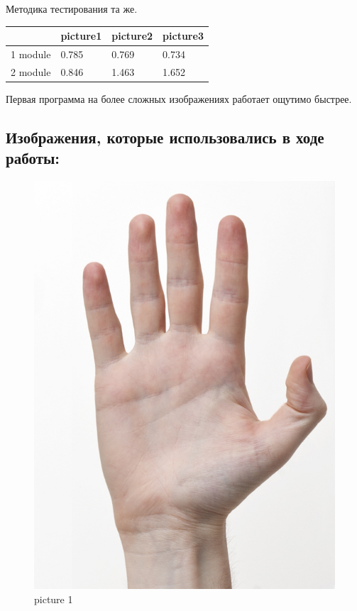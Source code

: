 \documentclass[
  12pt,
  a4paper,
]{article}
\begin{document}
Методика тестирования та же.

\begin{longtable}[]{@{}llll@{}}
\toprule
& picture1 & picture2 & picture3\tabularnewline
\midrule
\endhead
1 module & 0.785 & 0.769 & 0.734\tabularnewline
2 module & 0.846 & 1.463 & 1.652\tabularnewline
\bottomrule
\end{longtable}

Первая программа на более сложных изображениях работает ощутимо быстрее.

\hypertarget{ux438ux437ux43eux431ux440ux430ux436ux435ux43dux438ux44f-ux43aux43eux442ux43eux440ux44bux435-ux438ux441ux43fux43eux43bux44cux437ux43eux432ux430ux43bux438ux441ux44c-ux432-ux445ux43eux434ux435-ux440ux430ux431ux43eux442ux44b}{%
\subsection{Изображения, которые использовались в ходе
работы:}\label{ux438ux437ux43eux431ux440ux430ux436ux435ux43dux438ux44f-ux43aux43eux442ux43eux440ux44bux435-ux438ux441ux43fux43eux43bux44cux437ux43eux432ux430ux43bux438ux441ux44c-ux432-ux445ux43eux434ux435-ux440ux430ux431ux43eux442ux44b}}

\begin{figure}
\centering
\includegraphics{../hw2/HandPose/right-frontal.jpg}
\caption{picture 1}
\end{figure}
\end{document}
